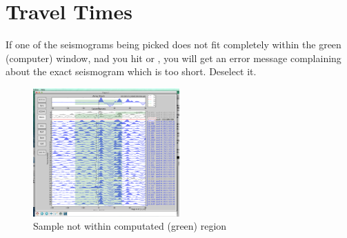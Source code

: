 \documentclass[letterpaper,10pt]{article}
\begin{document}


\section{Travel Times}

If one of the seismograms being picked does not fit completely within the green (computer) window, nad you hit  or , you will get an error message complaining about the exact seismogram which is too short. Deselect it. 

\begin{figure}[h!]
  \centering
  \includegraphics[width=0.5\textwidth]{images/not_enough_sample}
  \caption{Sample not within computated (green) region}
  \label{fig:not_enough_sample}
\end{figure}




\end{document}
